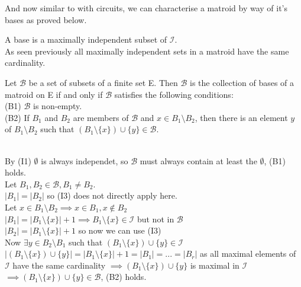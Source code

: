 \documentclass[../main.tex]{subfiles}
\begin{document}
\noindent And now similar to with circuits, we can characterise a matroid by way of it's bases as proved below. 
\begin{defn}
A base is a maximally independent subset of $\mathcal{I}.$\\
\noindent As seen previously all maximally independent sets in a matroid have the same cardinality.
\end{defn}

\begin{thm}
 Let $\mathcal{B}$ be a set of subsets of a finite set E. Then $\mathcal{B}$ is the collection of bases of a matroid on E if and only if $\mathcal{B}$ satisfies the following conditions:\\
 (B1) $\mathcal{B}$ is non-empty.\\
 (B2) If $B_1$ and $B_2$ are members of $\mathcal{B}$ and $x \in B_1 \setminus B_2$, then there is an element $y$ of $B_1 \setminus B_2$ such that $(B_1 \setminus \{x\}) \cup \{y\} \in \mathcal{B}$.
 \end{thm}

\noindent \Proof \\
\noindent By (I1) $\emptyset$ is always independet, so $\mathcal{B}$ must always contain at least the $\emptyset$, (B1) holds.\\
\noindent Let $B_1 ,B_2 \in \mathcal{B}, B_1 \neq B_2.$ \\
\noindent $|B_1| = |B_2|$ so (I3) does not directly apply here.\\
\noindent Let $x \in B_1 \setminus B_2 \implies x \in B_1, x \notin B_2$\\
\noindent $|B_1| = |B_1 \setminus \{x\}| + 1 \implies B_1 \setminus \{x\} \in \mathcal{I}$ but not in $\mathcal{B}$\\
\noindent $|B_2| = |B_1 \setminus \{x\}| + 1$ so now we can use (I3)\\
\noindent Now $\exists y \in B_2 \setminus B_1$ such that $(B_1 \setminus \{x\}) \cup \{y\} \in \mathcal{I}$\\
$|(B_1 \setminus \{x\}) \cup \{y\}| = |B_1 \setminus \{x\}| + 1 = |B_1| = ... = |B_r|$ as all maximal elements of $\mathcal{I}$ have the same cardinality $\implies (B_1 \setminus \{x\}) \cup \{y\}$ is maximal in $\mathcal{I}$\\
$\implies (B_1 \setminus \{x\}) \cup \{y\} \in \mathcal{B}$, (B2) holds.

\vspace{4mm}
\end{document}
